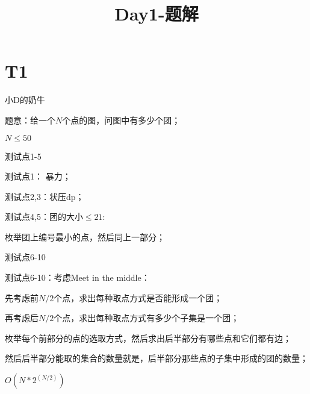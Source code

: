 \documentclass{beamer}
\title{Day1-题解}
\author{}
\institute{}
\begin{document}
\begin{frame}
	\maketitle
\end{frame}

\section{T1}
\begin{frame}{小D的奶牛}

	\par 题意：给一个$N$个点的图，问图中有多少个团；

	\par $N \leq 50$

\end{frame}

\begin{frame}{测试点1-5}

	\par 测试点1： 暴力；

	\pause

	\par 测试点2,3：状压dp；

	\pause

	\par 测试点4,5：团的大小$\leq 21$:

	\par 枚举团上编号最小的点，然后同上一部分；

\end{frame}

\begin{frame}{测试点6-10}

	\par 测试点6-10：考虑Meet in the middle：

	\pause 

	\par 先考虑前$N / 2$个点，求出每种取点方式是否能形成一个团；

	\par 再考虑后$N / 2$个点，求出每种取点方式有多少个子集是一个团；

	\pause

	\par 枚举每个前部分的点的选取方式，然后求出后半部分有哪些点和它们都有边；

	\par 然后后半部分能取的集合的数量就是，后半部分那些点的子集中形成的团的数量；

	\pause

	\par $O(N * 2 ^ (N / 2))$

\end{frame}
\end{document}
